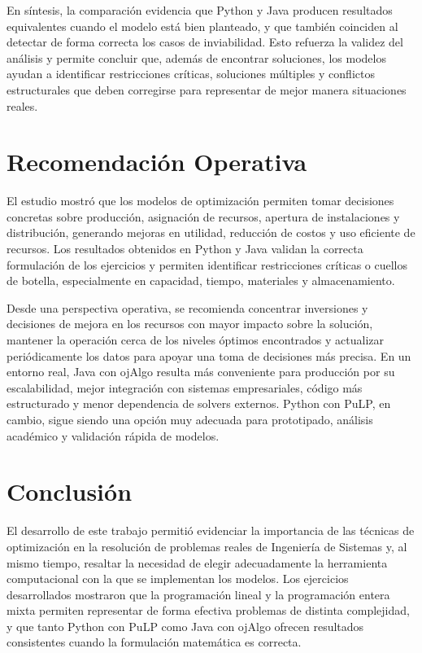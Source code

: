 \documentclass[12pt,a4paper]{article}
\begin{document}
En síntesis, la comparación evidencia que Python y Java producen resultados equivalentes cuando el modelo está bien planteado, y que también coinciden al detectar de forma correcta los casos de inviabilidad. Esto refuerza la validez del análisis y permite concluir que, además de encontrar soluciones, los modelos ayudan a identificar restricciones críticas, soluciones múltiples y conflictos estructurales que deben corregirse para representar de mejor manera situaciones reales.

\section{Recomendación Operativa}

El estudio mostró que los modelos de optimización permiten tomar decisiones concretas sobre producción, asignación de recursos, apertura de instalaciones y distribución, generando mejoras en utilidad, reducción de costos y uso eficiente de recursos. Los resultados obtenidos en Python y Java validan la correcta formulación de los ejercicios y permiten identificar restricciones críticas o cuellos de botella, especialmente en capacidad, tiempo, materiales y almacenamiento.

Desde una perspectiva operativa, se recomienda concentrar inversiones y decisiones de mejora en los recursos con mayor impacto sobre la solución, mantener la operación cerca de los niveles óptimos encontrados y actualizar periódicamente los datos para apoyar una toma de decisiones más precisa. En un entorno real, Java con ojAlgo resulta más conveniente para producción por su escalabilidad, mejor integración con sistemas empresariales, código más estructurado y menor dependencia de solvers externos. Python con PuLP, en cambio, sigue siendo una opción muy adecuada para prototipado, análisis académico y validación rápida de modelos.

\section{Conclusión}

El desarrollo de este trabajo permitió evidenciar la importancia de las técnicas de optimización en la resolución de problemas reales de Ingeniería de Sistemas y, al mismo tiempo, resaltar la necesidad de elegir adecuadamente la herramienta computacional con la que se implementan los modelos. Los ejercicios desarrollados mostraron que la programación lineal y la programación entera mixta permiten representar de forma efectiva problemas de distinta complejidad, y que tanto Python con PuLP como Java con ojAlgo ofrecen resultados consistentes cuando la formulación matemática es correcta.
\end{document}
